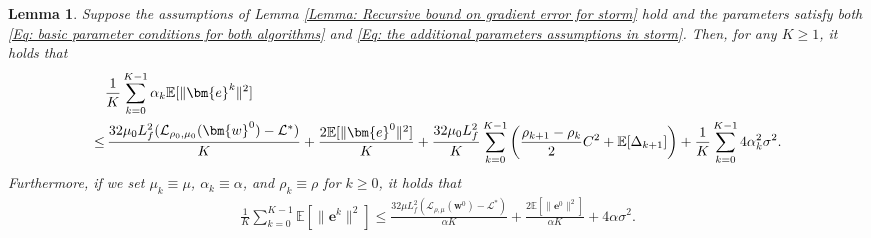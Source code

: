 \documentclass{article}
\theoremstyle{plain}
\newtheorem{lemma}{Lemma}[section]
\theoremstyle{definition}
\theoremstyle{remark}
\newcommand{\EE}{\mathbb{E}}
\newcommand{\be}{\bm{e}}
\newcommand{\calL}{\mathcal{L}}
\newcommand{\bw}{\bm{w}}
\newcommand{\sumK}{\sum_{k=0}^{K-1}}
\numberwithin{equation}{section}
\begin{document}
\begin{lemma}
    \label{Lemma: Weighted error accumulation of storm} Suppose the assumptions of
    Lemma \ref{Lemma: Recursive bound on gradient error for storm} hold and the parameters satisfy
    both \eqref{Eq: basic parameter conditions for both algorithms} and \eqref{Eq: the additional parameters assumptions in storm}.
    Then, for any $K \geq 1$, it holds that
    \begin{align}
        \label{Eq: weighted cumulative error bound for storm}
        &\frac{1}{K}\sumK \alpha_{k}\EE[\| \be^{k}\|^{2}] \notag \\
        \leq&\, \frac{32\mu_{0}L_f^{2}( \calL_{\rho_0, \mu_0}(\bw^{0}) - \calL^{*})}{K}+ \frac{2\EE [\| \be^{0}\|^{2}]}{K} + \frac{32\mu_0L_f^2}{K}\sumK \left( \frac{\rho_{k+1}- \rho_{k}}{2}C^2 + \EE[\Delta_{k+1}]\right)+ \frac{1}{K}\sum\limits_{k=0}^{K-1}4 \alpha_{k}^{2}\sigma^{2}.
    \end{align}
Furthermore, if we set $\mu_{k}\equiv \mu$, $\alpha_{k}\equiv \alpha$,
and $\rho_{k}\equiv \rho$ for $k \geq 0$, it holds that
    \begin{align}
        \label{Eq: weighted cumulative error bound under constant parameters for storm}\frac{1}{K}\sumK \EE[\| \be^{k}\|^{2}]\leq \frac{32\mu L_f^{2}( \calL_{\rho, \mu}(\bw^{0}) - \calL^{*})}{\alpha K}+ \frac{2\EE [\| \be^{0}\|^{2}]}{\alpha K}+ 4 \alpha \sigma^{2}.
    \end{align}
\end{lemma}
\end{document}
